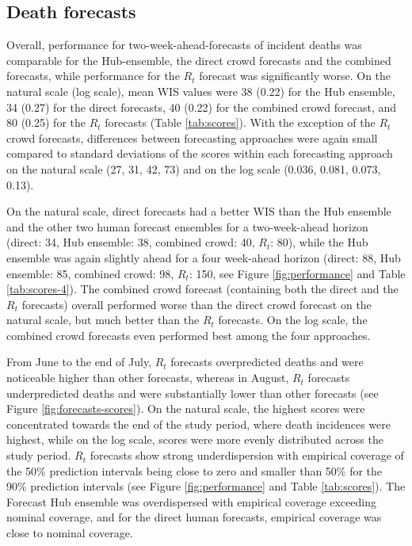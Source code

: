 \documentclass[10pt,a4paper,twocolumn]{article}
\begin{document}
\subsection*{Death forecasts} 

Overall, performance for two-week-ahead-forecasts of incident deaths was comparable for the Hub-ensemble, the direct crowd forecasts and the combined forecasts, while performance for the $R_t$ forecast was significantly worse. On the natural scale (log scale), mean WIS values were 38 (0.22) for the Hub ensemble, 34 (0.27) for the direct forecasts, 40 (0.22) for the combined crowd forecast, and 80 (0.25) for the $R_t$ forecasts (Table \ref{tab:scores}). 
With the exception of the $R_t$ crowd forecasts, differences between forecasting approaches were again small compared to 
standard deviations of
the scores within each forecasting approach on the natural scale (27, 31, 42, 73) and on the log scale (0.036, 0.081, 0.073, 0.13). 

On the natural scale, direct forecasts had a better WIS than the Hub ensemble and the other two human forecast ensembles for a two-week-ahead horizon (direct: 34, Hub ensemble: 38, combined crowd: 40, $R_t$: 80), while the Hub ensemble was again slightly ahead for a four week-ahead horizon (direct: 88, Hub ensemble: 85, combined crowd: 98, $R_t$: 150, see Figure \ref{fig:performance} and Table \ref{tab:scores-4}). The combined crowd forecast (containing both the direct and the $R_t$ forecasts) overall performed worse than the direct crowd forecast on the natural scale, but much better than the $R_t$ forecasts. On the log scale, the combined crowd forecasts even performed best among the four approaches. 

From June to the end of July, $R_t$ forecasts overpredicted deaths and were noticeable higher than other forecasts, whereas in August, $R_t$ forecasts underpredicted deaths and were substantially lower than other forecasts (see Figure \ref{fig:forecasts-scores}). On the natural scale, the highest scores were concentrated towards the end of the study period, where death incidences were highest, while on the log scale, scores were more evenly distributed across the study period. $R_t$ forecasts show strong underdispersion with empirical coverage of the 50\% prediction intervals being close to zero and smaller than 50\% for the 90\% prediction intervals (see Figure \ref{fig:performance} and Table \ref{tab:scores}). The Forecast Hub ensemble was overdispersed with empirical coverage exceeding nominal coverage, and for the direct human forecasts, empirical coverage was close to nominal coverage. 
\end{document}
